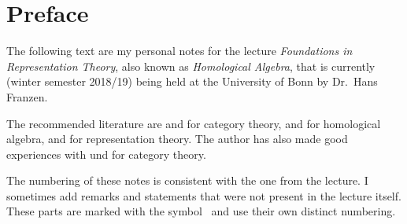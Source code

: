 \chapter{Preface}

The following text are my personal notes for the lecture \emph{Foundations in Representation Theory}, also known as \emph{Homological Algebra}, that is currently (winter semester 2018/19) being held at the University of Bonn by Dr.\ Hans Franzen.

The recommended literature are \cite{Working} and \cite{Schubert} for category theory, \cite[Chapter~1]{SheavesManifolds} and \cite{Weibel} for homological algebra, and \cite{Elements} for representation theory.
The author has also made good experiences with \cite{BasicCategory} und \cite{Brandenburg} for category theory.

The numbering of these notes is consistent with the one from the lecture.
I sometimes add remarks and statements that were not present in the lecture itself.
These parts are marked with the symbol~\textsuperscript{\extrasymbol} and use their own distinct numbering.




